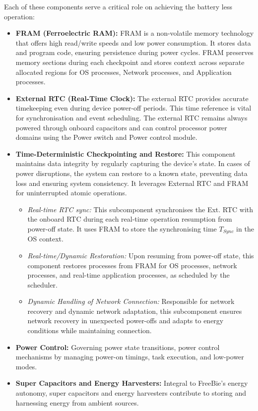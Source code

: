 \noindent Each of these components serve a critical role on achieving the battery less operation:
\begin{itemize}
    \item \textbf{FRAM (Ferroelectric RAM):} FRAM is a non-volatile memory technology that offers high read/write speeds and low power consumption. It stores data and program code, ensuring persistence during power cycles. FRAM preserves memory sections during each checkpoint and stores context across separate allocated regions for OS processes, Network processes, and Application processes.
    
    \item \textbf{External RTC (Real-Time Clock):} The external RTC provides accurate timekeeping even during device power-off periods. This time reference is vital for synchronisation and event scheduling. The external RTC remains always powered through onboard capacitors and can control processor power domains using the Power switch and Power control module.
    
    \item \textbf{Time-Deterministic Checkpointing and Restore:} This component maintains data integrity by regularly capturing the device's state. In cases of power disruptions, the system can restore to a known state, preventing data loss and ensuring system consistency. It leverages External RTC and FRAM for uninterrupted atomic operations.
    
    \begin{itemize}
        \item \textit{Real-time RTC sync:} This subcomponent synchronises the Ext. RTC with the onboard RTC during each real-time operation resumption from power-off state. It uses FRAM to store the synchronising time \(T_{Sync}\) in the OS context.
        \item \textit{Real-time/Dynamic Restoration:} Upon resuming from power-off state, this component restores processes from FRAM for OS processes, network processes, and real-time application processes, as scheduled by the scheduler.
        \item \textit{Dynamic Handling of Network Connection:} Responsible for network recovery and dynamic network adaptation, this subcomponent ensures network recovery in unexpected power-offs and adapts to energy conditions while maintaining connection.
    \end{itemize}
    
    \item \textbf{Power Control:} Governing power state transitions, power control mechanisms by managing power-on timings, task execution, and low-power modes.
    
    \item \textbf{Super Capacitors and Energy Harvesters:} Integral to FreeBie's energy autonomy, super capacitors and energy harvesters contribute to storing and harnessing energy from ambient sources.
\end{itemize}

